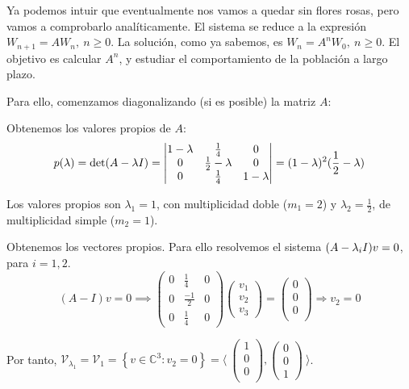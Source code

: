 Ya podemos intuir que eventualmente nos vamos a quedar sin flores rosas, pero
vamos a comprobarlo analíticamente.
El sistema se reduce a la expresión $W_{n+1} = AW_n,\ n \geq 0$. La solución, como ya sabemos, es $W_n = A^nW_0,\ n \ge 0$. El objetivo es calcular $A^n$, y estudiar el comportamiento de la población a largo plazo.

Para ello, comenzamos diagonalizando (si es posible) la matriz $A$:

\begin{nlist}
\item Obtenemos los valores propios de $A$:
  $$p(\lambda) = \det(A - \lambda I) =
  \begin{vmatrix}
    1 - \lambda & \frac{1}{4} & 0 \\
    0 & \frac{1}{2} - \lambda & 0 \\
    0 & \frac{1}{4} & 1 - \lambda
  \end{vmatrix} = (1-\lambda)^2(\frac{1}{2} - \lambda)$$

  Los valores propios son $\lambda_1 = 1$, con multiplicidad doble ($m_1 = 2$) y
  $\lambda_2 = \frac{1}{2}$, de multiplicidad simple ($m_2 = 1$).
\item Obtenemos los vectores propios. Para ello resolvemos el sistema $(A - \lambda_iI)v
  = 0$, para $i=1,2$.
  $$ (A - I)v = 0 \implies
  \begin{pmatrix}
    0 & \frac{1}{4} & 0 \\
    0 & \frac{-1}{2} & 0 \\
    0 & \frac{1}{4} & 0
  \end{pmatrix}
  \begin{pmatrix}
    v_1 \\
    v_2 \\
    v_3
  \end{pmatrix} =
  \begin{pmatrix}
    0 \\
    0 \\
    0 \\
  \end{pmatrix} \Rightarrow v_2 = 0$$

  Por tanto, $\mathcal V_{\lambda_1} = \mathcal V_1 = \left\{ v \in \mathbb C^3 : v_2 = 0 \right\} = \langle \
  \begin{pmatrix}
    1 \\
    0 \\
    0 \\
  \end{pmatrix},
  \begin{pmatrix}
    0 \\
    0 \\
    1
  \end{pmatrix}\ \rangle$.


\end{nlist}
